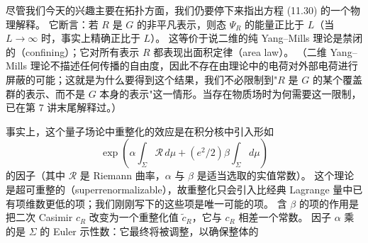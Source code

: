 
尽管我们今天的兴趣主要在拓扑方面，我们仍要停下来指出方程 (11.30) 的一个物理解释。
它断言：若 $R$ 是 $G$ 的非平凡表示，则态 $\Psi_{R}$ 的能量正比于 $L$（当 $L\to\infty$ 时，事实上精确正比于 $L$）。
这等价于说二维的纯 Yang–Mills 理论是禁闭的（confining）；它对所有表示 $R$ 都表现出面积定律（area law）。
（二维 Yang–Mills 理论不描述任何传播的自由度，因此不存在由理论中的电荷对外部电荷进行屏蔽的可能；这就是为什么要得到这个结果，我们不必限制到"$R$ 是 $G$ 的某个覆盖群的表示、而不是 $G$ 本身的表示"这一情形。当存在物质场时为何需要这一限制，已在第 7 讲末尾解释过。）

事实上，这个量子场论中重整化的效应是在积分核中引入形如
\begin{equation}
  \tag{11.32}
  \label{eq:11-32}
  \exp\left(\alpha\int_{\Sigma}\mathcal{R}\,d\mu+(e^{2}/2)\beta\int_{\Sigma}d\mu\right)
\end{equation}
的因子（其中 $\mathcal{R}$ 是 Riemann 曲率，$\alpha$ 与 $\beta$ 是适当选取的实值常数）。
这个理论是超可重整的（superrenormalizable），故重整化只会引入比经典 Lagrange 量中已有项维数更低的项；我们刚刚写下的这些项是唯一可能的项。
含 $\beta$ 的项的作用是把二次 Casimir $c_{R}$ 改变为一个重整化值 $\widetilde c_{R}$，它与 $c_{R}$ 相差一个常数。
因子 $\alpha$ 乘的是 $\Sigma$ 的 Euler 示性数：它最终将被调整，以确保整体的


